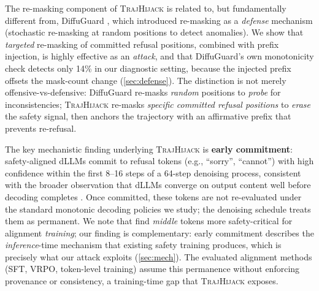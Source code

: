 \documentclass{article}
\theoremstyle{coloredthm}
\newcommand{\method}{\textsc{TrajHijack}}
\newcommand{\dllms}{dLLMs}
\begin{document}
The re-masking component of \method{} is related to, but fundamentally different from, DiffuGuard \citep{li2025diffuguard}, which introduced re-masking as a \textit{defense} mechanism (stochastic re-masking at random positions to detect anomalies). We show that \textit{targeted} re-masking of committed refusal positions, combined with prefix injection, is highly effective as an \textit{attack}, and that DiffuGuard's own monotonicity check detects only 14\% in our diagnostic setting, because the injected prefix offsets the mask-count change (\cref{sec:defense}). The distinction is not merely offensive-vs-defensive: DiffuGuard re-masks \textit{random} positions to \textit{probe} for inconsistencies; \method{} re-masks \textit{specific committed refusal positions} to \textit{erase} the safety signal, then anchors the trajectory with an affirmative prefix that prevents re-refusal.

The key mechanistic finding underlying \method{} is \textbf{early commitment}: safety-aligned \dllms{} commit to refusal tokens (e.g., ``sorry'', ``cannot'') with high confidence within the first 8--16 steps of a 64-step denoising process, consistent with the broader observation that \dllms{} converge on output content well before decoding completes \citep{li2025earlycommit}. Once committed, these tokens are not re-evaluated under the standard monotonic decoding policies we study; the denoising schedule treats them as permanent. We note that \citet{xie2026mosa} find \textit{middle} tokens more safety-critical for alignment \textit{training}; our finding is complementary: early commitment describes the \textit{inference}-time mechanism that existing safety training produces, which is precisely what our attack exploits (\cref{sec:mech}). The evaluated alignment methods (SFT, VRPO, token-level training) assume this permanence without enforcing provenance or consistency, a training-time gap that \method{} exposes.
\end{document}
